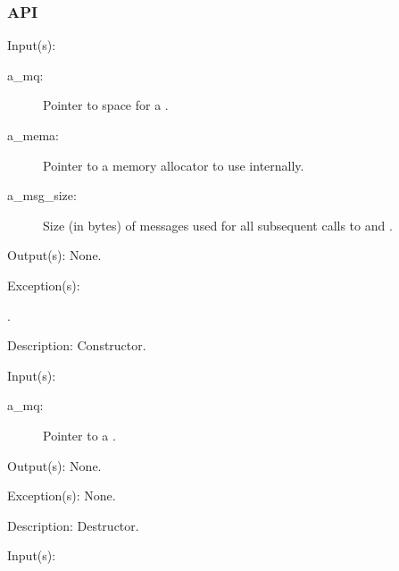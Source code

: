 \subsubsection{API}
\begin{capi}
\label{mq_new}
	\begin{capilist}
	\item[Input(s): ]
		\begin{description}\item[]
		\item[a\_mq: ]
			Pointer to space for a .
		\item[a\_mema: ]
			Pointer to a memory allocator to use internally.
		\item[a\_msg\_size: ]
			Size (in bytes) of messages used for all subsequent
			calls to  and .
		\end{description}
	\item[Output(s): ] None.
	\item[Exception(s): ]
		\begin{description}\item[]
		\item[.]
		\end{description}
	\item[Description: ]
		Constructor.
	\end{capilist}
\label{mq_delete}
	\begin{capilist}
	\item[Input(s): ]
		\begin{description}\item[]
		\item[a\_mq: ]
			Pointer to a \classname{mq}.
		\end{description}
	\item[Output(s): ] None.
	\item[Exception(s): ] None.
	\item[Description: ]
		Destructor.
	\end{capilist}
\label{mq_tryget}
	\begin{capilist}
	\item[Input(s): ]
		\begin{description}\item[]

\end{description}
\end{capilist}
\end{capi}
